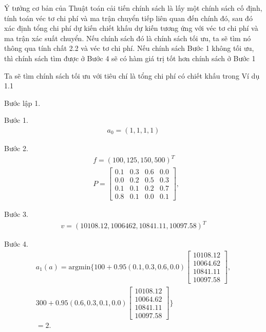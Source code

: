\documentclass[12pt,a4paper]{report}
\begin{document}
  
  \selectfont
  Ý tưởng cơ bản của Thuật toán cải tiến chính sách là lấy một chính sách cố định, tính toán véc tơ chi phí và ma trận chuyển tiếp liên quan đến chính đó, sau đó xác định tổng chi phí dự kiến chiết khấu dự kiến tương ứng với véc tơ chi phí và ma trận xác suất chuyển. Nếu chính sách đó là chính sách tối ưu, ta sẽ tìm nó thông qua tính chất 2.2 và véc tơ chi phí. Nếu chính sách Bước 1 không tối ưu, thì chính sách tìm được ở Bước 4 sẽ có hàm giá trị tốt hơn chính sách ở Bước 1
 
 \medskip
 Ta sẽ tìm chính sách tối ưu với tiêu chí là tổng chi phí có chiết khấu trong Ví dụ 1.1
 
 \medskip
 \noindent
 Bước lập 1.
 
 \noindent
 Bước 1. 
 \begin{align*}
 a_0=(1,1,1,1)
 \end{align*}
 
 \medskip
 \noindent
 Bước 2. 
 \begin{align*}
 &f=(100, 125, 150, 500)^T\\
 &P=\left[
 \begin{array}{cccc}
0.1&0.3&0.6&0.0\\
0.0&0.2&0.5&0.3\\
0.1&0.1&0.2&0.7\\
0.8&0.1&0.0&0.1
\end{array}
\right], 
 \end{align*}
 
 \medskip
 \noindent
 Bước 3. 
 \begin{align*}
 v=(10108.12, 1006462, 10841.11, 10097.58)^T
 \end{align*} 
     
  \medskip
  \noindent
  Bước 4. 
  \begin{align*}
  a_1(a)=\mathrm{argmin}\{100+0.95(0.1,0.3,0.6,0.0)\left[
  \begin{array}{c}
  10108.12\\
  10064.62\\
  10841.11\\
  10097.58
  \end{array}
  \right],\\
  300+0.95(0.6,0.3,0.1,0.0)\left[
  \begin{array}{c}
 10108.12\\
10064.62\\
10841.11\\
10097.58
  \end{array}
  \right]\}\\
  =2.
  \end{align*}
  
\end{document}
